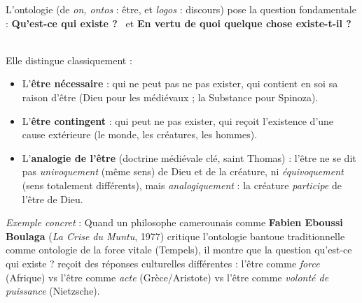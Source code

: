 \documentclass[11pt]{article}
\begin{document}
\begin{definition}
L'ontologie (de \emph{on, ontos} : être, et \emph{logos} : discours) pose la question fondamentale : \guillemotleft \textbf{Qu'est-ce qui existe ?} \guillemotright\ et \guillemotleft \textbf{En vertu de quoi quelque chose existe-t-il ?} \guillemotright\
\par
Elle distingue classiquement :
\begin{itemize}
    \item L'\textbf{être nécessaire} : qui ne peut pas ne pas exister, qui contient en soi sa raison d'être (Dieu pour les médiévaux ; la Substance pour Spinoza).
    \item L'\textbf{être contingent} : qui peut ne pas exister, qui reçoit l'existence d'une cause extérieure (le monde, les créatures, les hommes).
    \item L'\textbf{analogie de l'être} (doctrine médiévale clé, saint Thomas) : l'être ne se dit pas \emph{univoquement} (même sens) de Dieu et de la créature, ni \emph{équivoquement} (sens totalement différents), mais \emph{analogiquement} : la créature \emph{participe} de l'être de Dieu.
\end{itemize}
\par
\emph{Exemple concret} : Quand un philosophe camerounais comme \textbf{Fabien Eboussi Boulaga} (\emph{La Crise du Muntu}, 1977) critique l'ontologie bantoue traditionnelle comme \guillemotleft ontologie de la force vitale \guillemotright (Tempels), il montre que la question \guillemotleft qu'est-ce qui existe ? \guillemotright reçoit des réponses culturelles différentes : l'être comme \emph{force} (Afrique) vs l'être comme \emph{acte} (Grèce/Aristote) vs l'être comme \emph{volonté de puissance} (Nietzsche).
\end{definition}
\end{document}
